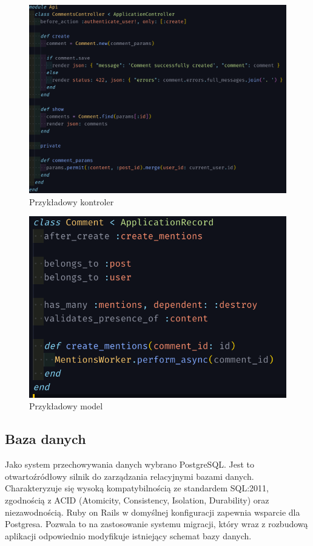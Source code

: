 \documentclass[declaration,shortabstract]{iithesis}
\begin{document}
\begin{figure}
    \centering
    \includegraphics[width=\textwidth]{images/kontroler.png}
    \caption{Przykładowy kontroler}
    \label{fig:kontroler}
\end{figure}
\begin{figure}
    \centering
    \includegraphics[width=\textwidth]{images/comment_model.png}
    \caption{Przykładowy model}
    \label{fig:model}
\end{figure}


\subsection{Baza danych}
Jako system przechowywania danych wybrano PostgreSQL. Jest to otwartoźródłowy silnik do zarządzania relacyjnymi bazami danych. Charakteryzuje się wysoką kompatybilnością ze standardem SQL:2011, zgodnością z ACID (Atomicity, Consistency, Isolation, Durability) oraz niezawodnością. Ruby on Rails w domyślnej konfiguracji zapewnia wsparcie dla Postgresa. Pozwala to na zastosowanie systemu migracji, który wraz z rozbudową aplikacji odpowiednio modyfikuje istniejący schemat bazy danych.
\end{document}
